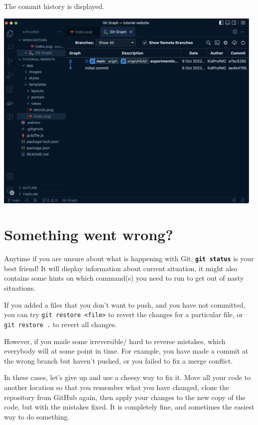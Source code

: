 The commit history is displayed.

\begin{center}
\includegraphics[width=13cm]{images/ch3-gitgraph2.png}
\end{center}

\section{Something went wrong?}
\label{sec:gitpractice}

Anytime if you are unsure about what is happening with Git, \textbf{\texttt{git status}} is your best friend! It will display information about current situation, it might also contains some hints on which command(s) you need to run to get out of nasty situations.
\vspace{6mm}

If you added a files that you don't want to push, and you have not committed, you can try \texttt{git restore <file>} to revert the changes for a particular file, or \texttt{git restore .} to revert all changes.

However, if you made some irreversible/ hard to reverse mistakes, which everybody will at some point in time. For example, you have made a commit at the wrong branch but haven't pushed, or you failed to fix a merge conflict. 

In these cases, let's give up and use a cheesy way to fix it. Move all your code to another location so that you remember what you have changed, clone the repository from GitHub again, then apply your changes to the new copy of the code, but with the mistakes fixed. It is completely fine, and sometimes the easiest way to do something.

